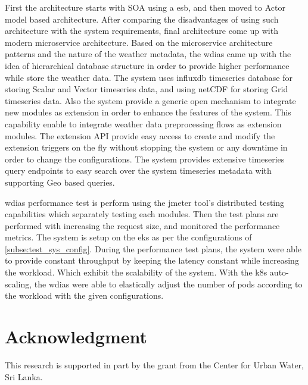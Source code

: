 \documentclass[conference]{IEEEtran}
\newcommand{\db}[1]{\textcolor{blue!40}{#1}}
\begin{document}
First the architecture starts with SOA using a \acrfull{esb}, and then moved to Actor model based architecture. After comparing the disadvantages of using such architecture with the system requirements, final architecture come up with modern microservice architecture.
Based on the microservice architecture patterns and the nature of the weather metadata, the \acrshort{wdias} came up with the idea of hierarchical database structure in order to provide higher performance while store the weather data. The system uses \acrshort{influxdb} timeseries database for storing Scalar and Vector timeseries data, and using \acrshort{netCDF} for storing Grid timeseries data.
Also the system provide a generic open mechanism to integrate new modules as extension in order to enhance the features of the system. This capability enable to integrate weather data preprocessing flows as extension modules.
The extension API provide easy access to create and modify the extension triggers on the fly without stopping the system or any downtime in order to change the configurations.
The system provides extensive timeseries query endpoints to easy search over the system timeseries metadata with supporting Geo based queries.

\acrshort{wdias} performance test is perform using the \acrshort{jmeter} tool's distributed testing capabilities which separately testing each modules. Then the test plans are performed with increasing the request size, and monitored the performance metrics. The system is setup on the \acrfull{eks} as per the configurations of \cref{subse:test_sys_config}.
During the performance test plans, the system were able to provide constant throughput by keeping the latency constant while increasing the workload. Which exhibit the scalability of the system.
With the \acrshort{k8s} auto-scaling, the \acrshort{wdias} were able to elastically adjust the number of pods according to the workload with the given configurations.

\section*{Acknowledgment}
\label{pse:ack}
\db{This research is supported in part by the grant from the Center for Urban Water, Sri Lanka.}


\graphicspath{ {./images/} }

\printbibliography[title={References}]
\end{document}
